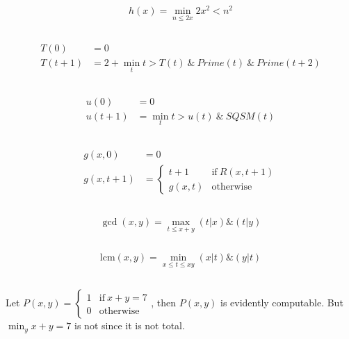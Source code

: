 \subsection{}
\[ h(x) = \min_{n\le 2x}{2x^2<n^2} \]

\subsection{}
\begin{align*}
  T(0)   & = 0 \\
  T(t+1) & = 2 + \min_{t}t>T(t) \ \&\ Prime(t) \ \&\ Prime(t+2)
\end{align*}


\subsection{}
\begin{align*}
  u(0)   & = 0 \\
  u(t+1) & = \min_{t}t>u(t) \ \&\ SQSM(t)
\end{align*}


\subsection{}
\begin{align*}
  g(x,0)   & = 0 \\
  g(x,t+1) & =
    \begin{cases}
      t+1    & \mathrm{if}\ R(x,t+1) \\
      g(x,t) & \mathrm{otherwise}
    \end{cases}
\end{align*}


\subsection{}
\[ \gcd(x,y) = \max_{t\le x+y}{(t|x)\&(t|y)} \]

\subsection{}
\[ \mathrm{lcm}(x,y) = \min_{x\le t\le xy}{(x|t)\&(y|t)} \]


\subsection{}
Let $ P(x,y) =
\begin{cases}
  1 & \mathrm{if}\ x+y=7 \\
  0 & \mathrm{otherwise}
\end{cases} $, then $ P(x,y) $ is evidently computable. But
$ \min_{y}{x+y=7} $ is not since it is not total.


